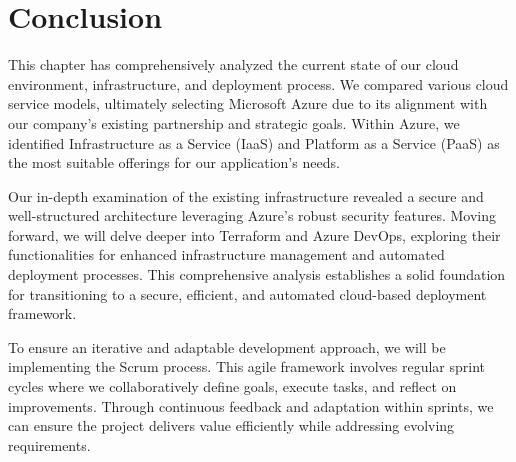 \section*{Conclusion}
This chapter has comprehensively analyzed the current state of our cloud environment, infrastructure, and deployment process. We compared various cloud service models, ultimately selecting Microsoft Azure due to its alignment with our company's existing partnership and strategic goals. Within Azure, we identified Infrastructure as a Service (IaaS) and Platform as a Service (PaaS) as the most suitable offerings for our application's needs.
\par
Our in-depth examination of the existing infrastructure revealed a secure and well-structured architecture leveraging Azure's robust security features. Moving forward, we will delve deeper into Terraform and Azure DevOps, exploring their functionalities for enhanced infrastructure management and automated deployment processes. This comprehensive analysis establishes a solid foundation for transitioning to a secure, efficient, and automated cloud-based deployment framework.
\par
To ensure an iterative and adaptable development approach, we will be implementing the Scrum process. This agile framework involves regular sprint cycles where we collaboratively define goals, execute tasks, and reflect on improvements. Through continuous feedback and adaptation within sprints, we can ensure the project delivers value efficiently while addressing evolving requirements.
